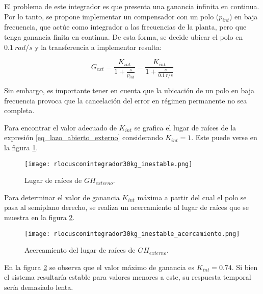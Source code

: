 El problema de este integrador es que presenta una ganancia infinita en continua. Por lo tanto, se propone implementar un compensador con un polo ($p_{int}$) en baja frecuencia, que actúe como integrador a las frecuencias de la planta, pero que tenga ganancia finita en continua. De esta forma, se decide ubicar el polo en $0.1\:rad/s$ y la transferencia a implementar resulta:

\begin{equation}
	G_{ext}=\frac{K_{int}}{1+\frac{s}{p_{int}}}=\frac{K_{int}}{1+\frac{s}{0.1\:r/s}}	
\end{equation}

Sin embargo, es importante tener en cuenta que la ubicación de un polo en baja frecuencia provoca que la cancelación del error en régimen permanente no sea completa.


Para encontrar el valor adecuado de $K_{int}$ se grafica el lugar de raíces de la expresión \ref{eq_lazo_abierto_externo} considerando $K_{int}=1$. Este puede verse en la figura \ref{fig:lugar-de-raices-con-integrador-analog_inestable}.

\begin{figure}[H]
	\centering
	\texttt{[image: rlocusconintegrador30kg\_inestable.png]}
	\caption{Lugar de raíces de $GH_{externo}$.}
	\label{fig:lugar-de-raices-con-integrador-analog_inestable}
\end{figure}

Para determinar el valor de ganancia $K_{int}$ máxima a partir del cual el polo se pasa al semiplano derecho, se realiza un acercamiento al lugar de raíces que se muestra en la figura \ref{fig:lugar-de-raices-con-integrador-analog_inestable_acercamiento}. 

\begin{figure}[H]
	\centering
	\texttt{[image: rlocusconintegrador30kg\_inestable\_acercamiento.png]}
	\caption{Acercamiento del lugar de raíces de $GH_{externo}$.}
	\label{fig:lugar-de-raices-con-integrador-analog_inestable_acercamiento}
\end{figure}

En la figura \ref{fig:lugar-de-raices-con-integrador-analog_inestable_acercamiento} se observa que el valor máximo de ganancia es $K_{int}=0.74$. Si bien el sistema resultaría estable para valores menores a este, su respuesta temporal sería demasiado lenta. 

